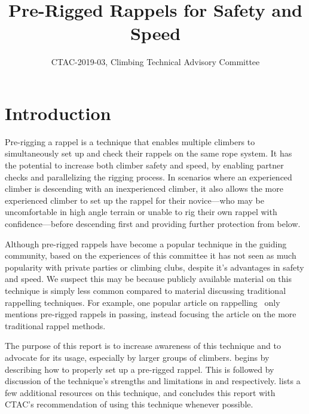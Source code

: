 \documentclass[nonacm,acmtog]{acmart}
\title{Pre-Rigged Rappels for Safety and Speed}
\subtitle{CTAC-2019-03, Climbing Technical Advisory Committee}
\begin{document}
\maketitle

\section{Introduction}
\label{sec:intro}

  Pre-rigging a rappel is a technique that enables multiple climbers to
  simultaneously set up and check their rappels on the same rope system.  It
  has the potential to increase both climber safety and speed, by enabling
  partner checks and parallelizing the rigging process.  In scenarios where an
  experienced climber is descending with an inexperienced climber, it also
  allows the more experienced climber to set up the rappel for their
  novice---who may be uncomfortable in high angle terrain or unable to rig
  their own rappel with confidence---before descending first and providing
  further protection from below.

  Although pre-rigged rappels have become a popular technique in the guiding
  community, based on the experiences of this committee it has not seen as much
  popularity with private parties or climbing clubs, despite it's advantages in
  safety and speed.  We suspect this may be because publicly available material
  on this technique is simply less common compared to material discussing
  traditional rappelling techniques.  For example, one popular article on
  rappelling~\cite{www:aac-rappelling} only mentions pre-rigged rappels in
  passing, instead focusing the article on the more traditional rappel methods.

  The purpose of this report is to increase awareness of this technique and to
  advocate for its usage, especially by larger groups of climbers.
   begins by describing how to properly set up a pre-rigged
  rappel.  This is followed by discussion of the technique's strengths and
  limitations in  and 
  respectively.
   lists a few additional resources on this technique, and
   concludes this report with CTAC's recommendation of
  using this technique whenever possible.
\end{document}
